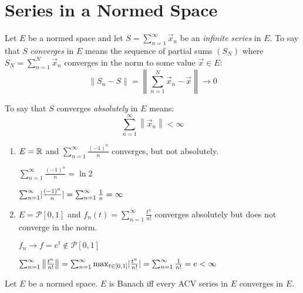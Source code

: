 \documentclass[letterpaper,12pt,fleqn]{article}
\newcommand{\norm}[1]{\left\|#1\right\|}
\newcommand{\vx}{\vec{x}}
\renewcommand{\mp}{\mathcal{P}}
\begin{document}
\section*{Series in a Normed Space}

\begin{definition}
  Let $E$ be a normed space and let $S=\sum_{n=1}^{\infty}\vx_n$ be an
  \emph{infinite series} in $E$. To say that $S$ \emph{converges} in $E$ means
  the sequence of partial sums $(S_N)$ where $S_N=\sum_{n=1}^N\vx_n$ converges
  in the norm to some value $\vx\in E$:
  \[\norm{S_n-S}=\norm{\sum_{n=1}^N\vx_n-\vx}\to0\]

  To say that $S$ converges \emph{absolutely} in $E$ means:
  \[\sum_{n=1}^{\infty}\norm{\vx_n}<\infty\]
\end{definition}

\begin{examples}
  \listbreak
  \begin{enumerate}
  \item $E=\mathbb{R}$ and $\sum_{n=1}^{\infty}\frac{(-1)^n}{n}$ converges, but not
    absolutely.

    $\sum_{n=1}^{\infty}\frac{(-1)^n}{n}=\ln{2}$

    $\sum_{n=1}^{\infty}\lvert\frac{(-1)^n}{n}\rvert=
    \sum_{n=1}^{\infty}\frac{1}{n}=\infty$

  \item $E=\mp[0,1]$ and $f_n(t)=\sum_{n=1}^{\infty}\frac{t^n}{n!}$
    converges absolutely but does not converge in the norm.

    $f_n\to f=e^t\notin\mp[0,1]$

    $\sum_{n=1}^{\infty}\norm{\frac{t^n}{n!}}=
    \sum_{n=1}^{\infty}\max_{t\in[0,1]}\abs{\frac{t^n}{n!}}=
    \sum_{n=1}^{\infty}\frac{1}{n!}=e<\infty$
  \end{enumerate}
\end{examples}

\begin{theorem}
  Let $E$ be a normed space. $E$ is Banach iff every ACV series in $E$
  converges in $E$.
\end{theorem}
\end{document}
